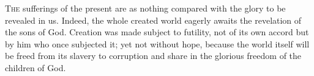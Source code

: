 
\lettrine{T}{he} sufferings of the present are as nothing compared with the glory to be revealed in us. Indeed, the whole created world eagerly awaits the revelation of the sons of God. Creation was made subject to futility, not of its own accord but by him who once subjected it; yet not without hope, because the world itself will be freed from its slavery to corruption and share in the glorious freedom of the children of God.